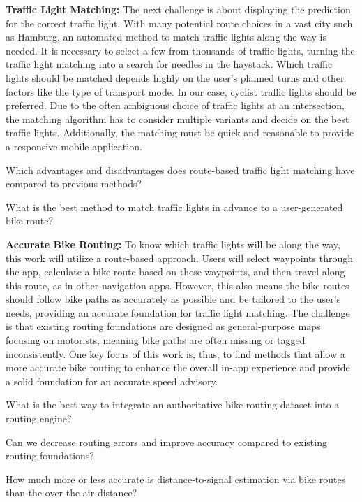 \textbf{\color{cidarkblue}Traffic Light Matching:} The next challenge is about displaying the prediction for the correct traffic light. With many potential route choices in a vast city such as Hamburg, an automated method to match traffic lights along the way is needed. It is necessary to select a few from thousands of traffic lights, turning the traffic light matching into a search for needles in the haystack. Which traffic lights should be matched depends highly on the user's planned turns and other factors like the type of transport mode. In our case, cyclist traffic lights should be preferred. Due to the often ambiguous choice of traffic lights at an intersection, the matching algorithm has to consider multiple variants and decide on the best traffic lights. Additionally, the matching must be quick and reasonable to provide a responsive mobile application.

\begin{researchquestion}
Which advantages and disadvantages does route-based traffic light matching have compared to previous methods?
\end{researchquestion}
\begin{researchquestion}
What is the best method to match traffic lights in advance to a user-generated bike route?
\end{researchquestion}

\textbf{\color{cidarkblue}Accurate Bike Routing:} To know which traffic lights will be along the way, this work will utilize a route-based approach. Users will select waypoints through the app, calculate a bike route based on these waypoints, and then travel along this route, as in other navigation apps. However, this also means the bike routes should follow bike paths as accurately as possible and be tailored to the user's needs, providing an accurate foundation for traffic light matching. The challenge is that existing routing foundations are designed as general-purpose maps focusing on motorists, meaning bike paths are often missing or tagged inconsistently. One key focus of this work is, thus, to find methods that allow a more accurate bike routing to enhance the overall in-app experience and provide a solid foundation for an accurate speed advisory.

\begin{researchquestion}
What is the best way to integrate an authoritative bike routing dataset into a routing engine?
\end{researchquestion}
\begin{researchquestion}
Can we decrease routing errors and improve accuracy compared to existing routing foundations?
\end{researchquestion}
\begin{researchquestion}
How much more or less accurate is distance-to-signal estimation via bike routes than the over-the-air distance?
\end{researchquestion}

